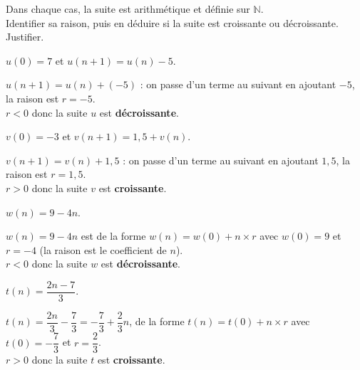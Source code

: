\documentclass[11pt,a4paper]{article}  %
\begin{document}
Dans chaque cas, la suite est arithmétique et définie sur $\mathbb{N}$.\\
Identifier sa raison, puis en déduire si la suite est croissante ou décroissante. Justifier.
\begin{enumMet}
	\item $u(0)=7$ et $u(n+1)=u(n)-5$.
	\par
	\begin{corrBox}
		$u(n+1)=u(n)+(-5)$ : on passe d'un terme au suivant en ajoutant $-5$, la raison est $r=-5$.\\
		$r<0$ donc la suite $u$ est \textbf{décroissante}.
	\end{corrBox}

	\item $v(0)=-3$ et $v(n+1)=1,5+v(n)$.
	\par
	\begin{corrBox}
		$v(n+1)=v(n)+1,5$ : on passe d'un terme au suivant en ajoutant $1,5$, la raison est $r=1,5$.\\
		$r>0$ donc la suite $v$ est \textbf{croissante}.
	\end{corrBox}

	\item $w(n)=9-4n$.
	\par
	\begin{corrBox}
		$w(n)=9-4n$ est de la forme $w(n)=w(0)+n\times r$ avec $w(0)=9$ et $r=-4$ (la raison est le coefficient de $n$).\\
		$r<0$ donc la suite $w$ est \textbf{décroissante}.
	\end{corrBox}

	\item {} $t(n)=\dfrac{2n-7}{3}$.
	\par
	\begin{corrBox}
		$t(n)=\dfrac{2n}{3}-\dfrac{7}{3}=-\dfrac{7}{3}+\dfrac{2}{3}n$, de la forme $t(n)=t(0)+n\times r$ avec $t(0)=-\dfrac{7}{3}$ et $r=\dfrac{2}{3}$.\\
		$r>0$ donc la suite $t$ est \textbf{croissante}.
	\end{corrBox}
\end{enumMet}
\end{document}
